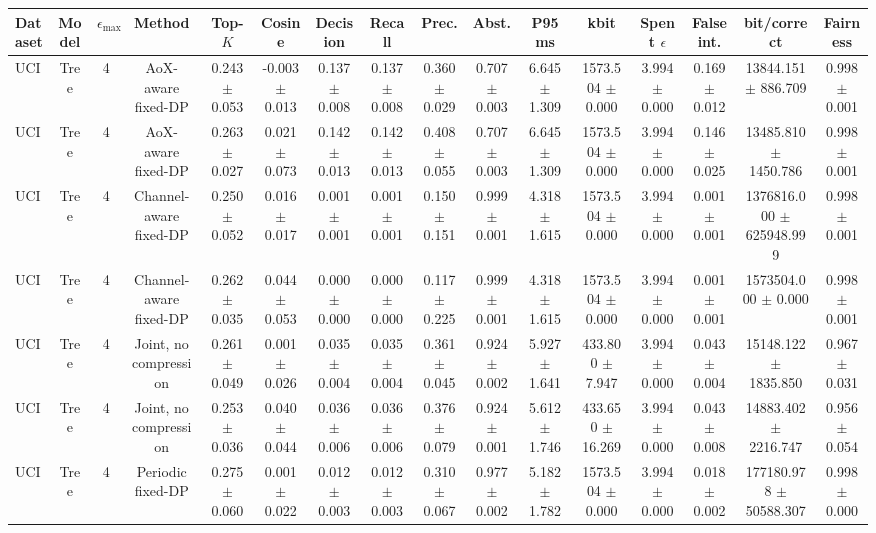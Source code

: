 \begin{tabular}{lccccccccccccccc}
\toprule
Dataset & Model & $\epsilon_{\max}$ & Method & Top-$K$ & Cosine & Decision & Recall & Prec. & Abst. & P95 ms & kbit & Spent $\epsilon$ & False int. & bit/correct & Fairness \\
\midrule
UCI & Tree & 4 & AoX-aware fixed-DP & 0.243 $\pm$ 0.053 & -0.003 $\pm$ 0.013 & 0.137 $\pm$ 0.008 & 0.137 $\pm$ 0.008 & 0.360 $\pm$ 0.029 & 0.707 $\pm$ 0.003 & 6.645 $\pm$ 1.309 & 1573.504 $\pm$ 0.000 & 3.994 $\pm$ 0.000 & 0.169 $\pm$ 0.012 & 13844.151 $\pm$ 886.709 & 0.998 $\pm$ 0.001 \\
UCI & Tree & 4 & AoX-aware fixed-DP & 0.263 $\pm$ 0.027 & 0.021 $\pm$ 0.073 & 0.142 $\pm$ 0.013 & 0.142 $\pm$ 0.013 & 0.408 $\pm$ 0.055 & 0.707 $\pm$ 0.003 & 6.645 $\pm$ 1.309 & 1573.504 $\pm$ 0.000 & 3.994 $\pm$ 0.000 & 0.146 $\pm$ 0.025 & 13485.810 $\pm$ 1450.786 & 0.998 $\pm$ 0.001 \\
UCI & Tree & 4 & Channel-aware fixed-DP & 0.250 $\pm$ 0.052 & 0.016 $\pm$ 0.017 & 0.001 $\pm$ 0.001 & 0.001 $\pm$ 0.001 & 0.150 $\pm$ 0.151 & 0.999 $\pm$ 0.001 & 4.318 $\pm$ 1.615 & 1573.504 $\pm$ 0.000 & 3.994 $\pm$ 0.000 & 0.001 $\pm$ 0.001 & 1376816.000 $\pm$ 625948.999 & 0.998 $\pm$ 0.001 \\
UCI & Tree & 4 & Channel-aware fixed-DP & 0.262 $\pm$ 0.035 & 0.044 $\pm$ 0.053 & 0.000 $\pm$ 0.000 & 0.000 $\pm$ 0.000 & 0.117 $\pm$ 0.225 & 0.999 $\pm$ 0.001 & 4.318 $\pm$ 1.615 & 1573.504 $\pm$ 0.000 & 3.994 $\pm$ 0.000 & 0.001 $\pm$ 0.001 & 1573504.000 $\pm$ 0.000 & 0.998 $\pm$ 0.001 \\
UCI & Tree & 4 & Joint, no compression & 0.261 $\pm$ 0.049 & 0.001 $\pm$ 0.026 & 0.035 $\pm$ 0.004 & 0.035 $\pm$ 0.004 & 0.361 $\pm$ 0.045 & 0.924 $\pm$ 0.002 & 5.927 $\pm$ 1.641 & 433.800 $\pm$ 7.947 & 3.994 $\pm$ 0.000 & 0.043 $\pm$ 0.004 & 15148.122 $\pm$ 1835.850 & 0.967 $\pm$ 0.031 \\
UCI & Tree & 4 & Joint, no compression & 0.253 $\pm$ 0.036 & 0.040 $\pm$ 0.044 & 0.036 $\pm$ 0.006 & 0.036 $\pm$ 0.006 & 0.376 $\pm$ 0.079 & 0.924 $\pm$ 0.001 & 5.612 $\pm$ 1.746 & 433.650 $\pm$ 16.269 & 3.994 $\pm$ 0.000 & 0.043 $\pm$ 0.008 & 14883.402 $\pm$ 2216.747 & 0.956 $\pm$ 0.054 \\
UCI & Tree & 4 & Periodic fixed-DP & 0.275 $\pm$ 0.060 & 0.001 $\pm$ 0.022 & 0.012 $\pm$ 0.003 & 0.012 $\pm$ 0.003 & 0.310 $\pm$ 0.067 & 0.977 $\pm$ 0.002 & 5.182 $\pm$ 1.782 & 1573.504 $\pm$ 0.000 & 3.994 $\pm$ 0.000 & 0.018 $\pm$ 0.002 & 177180.978 $\pm$ 50588.307 & 0.998 $\pm$ 0.000 \\

\end{tabular}
